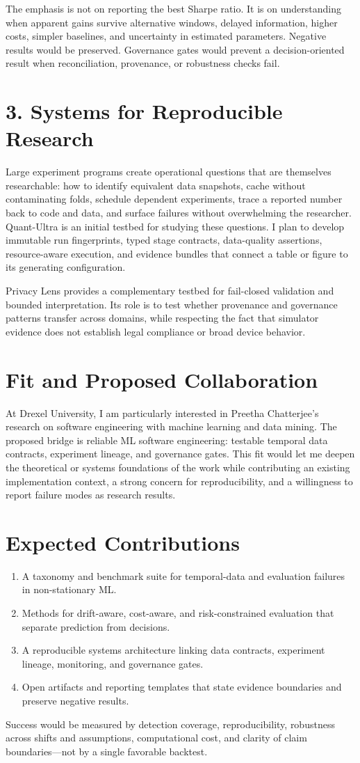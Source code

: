 \documentclass[11pt]{article}
\begin{document}
The emphasis is not on reporting the best Sharpe ratio. It is on understanding when apparent gains survive alternative windows, delayed information, higher costs, simpler baselines, and uncertainty in estimated parameters. Negative results would be preserved. Governance gates would prevent a decision-oriented result when reconciliation, provenance, or robustness checks fail.

\section*{3. Systems for Reproducible Research}
Large experiment programs create operational questions that are themselves researchable: how to identify equivalent data snapshots, cache without contaminating folds, schedule dependent experiments, trace a reported number back to code and data, and surface failures without overwhelming the researcher. Quant-Ultra is an initial testbed for studying these questions. I plan to develop immutable run fingerprints, typed stage contracts, data-quality assertions, resource-aware execution, and evidence bundles that connect a table or figure to its generating configuration.

Privacy Lens provides a complementary testbed for fail-closed validation and bounded interpretation. Its role is to test whether provenance and governance patterns transfer across domains, while respecting the fact that simulator evidence does not establish legal compliance or broad device behavior.

\section*{Fit and Proposed Collaboration}
At Drexel University, I am particularly interested in Preetha Chatterjee's research on software engineering with machine learning and data mining. The proposed bridge is reliable ML software engineering: testable temporal data contracts, experiment lineage, and governance gates. This fit would let me deepen the theoretical or systems foundations of the work while contributing an existing implementation context, a strong concern for reproducibility, and a willingness to report failure modes as research results.

\section*{Expected Contributions}
\begin{enumerate}
\item A taxonomy and benchmark suite for temporal-data and evaluation failures in non-stationary ML.
\item Methods for drift-aware, cost-aware, and risk-constrained evaluation that separate prediction from decisions.
\item A reproducible systems architecture linking data contracts, experiment lineage, monitoring, and governance gates.
\item Open artifacts and reporting templates that state evidence boundaries and preserve negative results.
\end{enumerate}

Success would be measured by detection coverage, reproducibility, robustness across shifts and assumptions, computational cost, and clarity of claim boundaries---not by a single favorable backtest.
\end{document}
